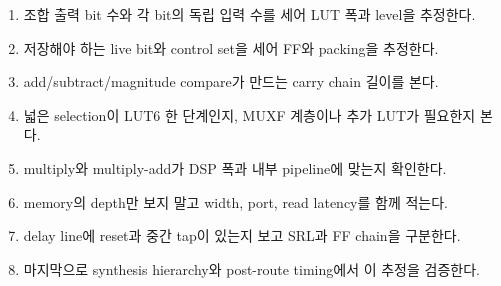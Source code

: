 \begin{checklistbox}
\begin{enumerate}
  \item 조합 출력 bit 수와 각 bit의 독립 입력 수를 세어 LUT 폭과 level을 추정한다.
  \item 저장해야 하는 live bit와 control set을 세어 FF와 packing을 추정한다.
  \item add/subtract/magnitude compare가 만드는 carry chain 길이를 본다.
  \item 넓은 selection이 LUT6 한 단계인지, MUXF 계층이나 추가 LUT가 필요한지 본다.
  \item multiply와 multiply-add가 DSP 폭과 내부 pipeline에 맞는지 확인한다.
  \item memory의 depth만 보지 말고 width, port, read latency를 함께 적는다.
  \item delay line에 reset과 중간 tap이 있는지 보고 SRL과 FF chain을 구분한다.
  \item 마지막으로 synthesis hierarchy와 post-route timing에서 이 추정을 검증한다.
\end{enumerate}
\end{checklistbox}
